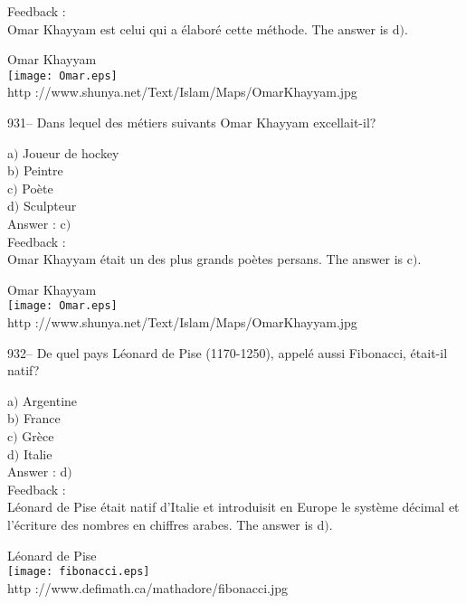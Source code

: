 ﻿\documentclass[letterpaper, 12pt]{article}
\begin{document}
Feedback :\\
Omar Khayyam est celui qui a \'elabor\'e cette m\'ethode. The answer is
d$)$.\\

        \begin{center}
        Omar Khayyam\\
    \texttt{[image: Omar.eps]}\\
        {\footnotesize http
://www.shunya.net/Text/Islam/Maps/OmarKhayyam.jpg}
    \end{center}

931-- Dans lequel des m\'etiers suivants Omar Khayyam excellait-il?

a$)$ Joueur de hockey \\
b$)$ Peintre \\
c$)$ Po\`ete \\
d$)$ Sculpteur \\

Answer : c$)$\\

Feedback : \\
Omar Khayyam \'etait un des plus grands po\`etes persans. The answer is
c$)$.\\

        \begin{center}
        Omar Khayyam\\
    \texttt{[image: Omar.eps]}\\
        {\footnotesize http
://www.shunya.net/Text/Islam/Maps/OmarKhayyam.jpg}
    \end{center}

932-- De quel pays L\'eonard de Pise (1170-1250), appel\'e aussi
Fibonacci, \'etait-il natif?

a$)$ Argentine \\
b$)$ France  \\
c$)$ Gr\`ece  \\
d$)$ Italie \\

Answer : d$)$\\

Feedback : \\
L\'eonard de Pise \'etait natif d'Italie et introduisit en Europe le
syst\`eme d\'ecimal et l'\'ecriture
des nombres en chiffres arabes. The answer is d$)$.\\

        \begin{center}
        L\'eonard de Pise\\
    \texttt{[image: fibonacci.eps]}\\
        {\footnotesize http ://www.defimath.ca/mathadore/fibonacci.jpg}
    \end{center}
\end{document}

